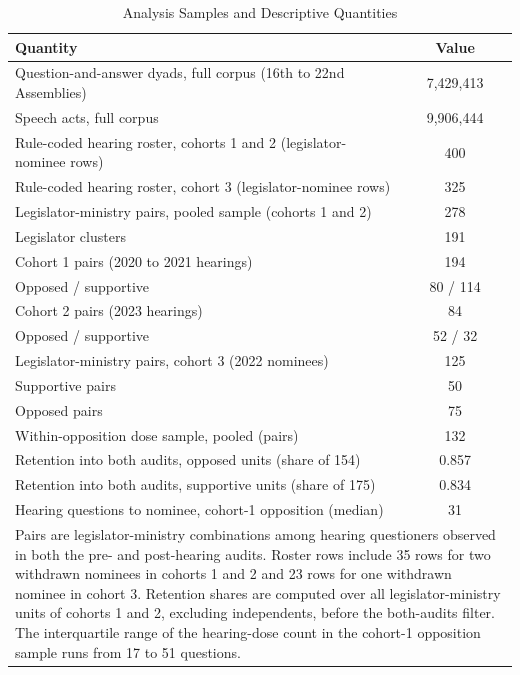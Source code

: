 \documentclass[11pt]{article}
\begin{document}
\begin{table}[!htbp]
\centering
\caption{Analysis Samples and Descriptive Quantities}
\label{tab:desc}
\begin{tabular}{lc}
\toprule
Quantity & Value \\
\midrule
Question-and-answer dyads, full corpus (16th to 22nd Assemblies) & 7,429,413 \\
Speech acts, full corpus & 9,906,444 \\
Rule-coded hearing roster, cohorts 1 and 2 (legislator-nominee rows) & 400 \\
Rule-coded hearing roster, cohort 3 (legislator-nominee rows) & 325 \\
Legislator-ministry pairs, pooled sample (cohorts 1 and 2) & 278 \\
\quad Legislator clusters & 191 \\
\quad Cohort 1 pairs (2020 to 2021 hearings) & 194 \\
\quad\quad Opposed / supportive & 80 / 114 \\
\quad Cohort 2 pairs (2023 hearings) & 84 \\
\quad\quad Opposed / supportive & 52 / 32 \\
Legislator-ministry pairs, cohort 3 (2022 nominees) & 125 \\
\quad Supportive pairs & 50 \\
\quad Opposed pairs & 75 \\
Within-opposition dose sample, pooled (pairs) & 132 \\
Retention into both audits, opposed units (share of 154) & 0.857 \\
Retention into both audits, supportive units (share of 175) & 0.834 \\
Hearing questions to nominee, cohort-1 opposition (median) & 31 \\
\bottomrule
\multicolumn{2}{l}{\footnotesize \parbox{0.92\textwidth}{Pairs are legislator-ministry combinations among hearing questioners observed in both the pre- and post-hearing audits. Roster rows include 35 rows for two withdrawn nominees in cohorts 1 and 2 and 23 rows for one withdrawn nominee in cohort 3. Retention shares are computed over all legislator-ministry units of cohorts 1 and 2, excluding independents, before the both-audits filter. The interquartile range of the hearing-dose count in the cohort-1 opposition sample runs from 17 to 51 questions.}} \\
\end{tabular}
\end{table}
\end{document}

